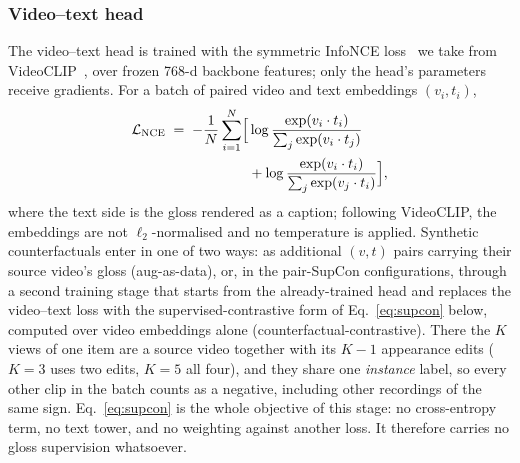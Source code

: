 \subsubsection{Video--text head}
The video--text head is trained with the symmetric InfoNCE
loss~\cite{oordRepresentationLearningContrastive2018}
we take from VideoCLIP~\cite{xuVideoCLIPContrastivePretraining2021}, over frozen
768-d backbone features; only the head's parameters receive gradients.
For a batch of paired video and text
embeddings $(v_i, t_i)$,
\begin{equation}
\label{eq:nce}
\begin{split}
\mathcal{L}_{\mathrm{NCE}} \;=\;
-\frac{1}{N}\sum_{i=1}^{N}\Bigl[&
\log \frac{\exp(v_i \cdot t_i)}{\sum_{j}\exp(v_i \cdot t_j)}\\
&+ \log \frac{\exp(v_i \cdot t_i)}{\sum_{j}\exp(v_j \cdot t_i)}
\Bigr],
\end{split}
\end{equation}
where the text side is the gloss rendered as a caption; following
VideoCLIP, the embeddings are not $\ell_2$-normalised and no temperature is
applied. Synthetic counterfactuals enter in one of two ways: as additional
$(v, t)$ pairs carrying their source video's gloss (aug-as-data), or, in
the pair-SupCon configurations, through a second training stage that
starts from the already-trained head and replaces the video--text loss
with the supervised-contrastive form of Eq.~\eqref{eq:supcon} below,
computed over video embeddings alone (counterfactual-contrastive).
There the $K$ views of one item are a source video together with its
$K-1$ appearance edits ($K{=}3$ uses two edits, $K{=}5$ all four), and
they share one \emph{instance} label, so every other clip in the batch
counts as a negative, including other recordings of the same sign.
Eq.~\eqref{eq:supcon} is the whole objective of this stage: no
cross-entropy term, no text tower, and no weighting against another loss.
It therefore carries no gloss supervision whatsoever.

